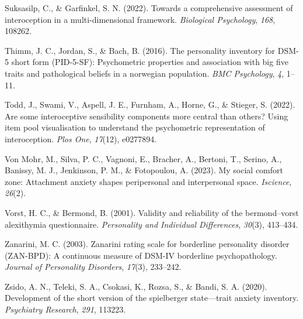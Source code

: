 \documentclass[
  jou,
  floatsintext,
  longtable,
  nolmodern,
  notxfonts,
  notimes,
  colorlinks=true,linkcolor=blue,citecolor=blue,urlcolor=blue]{apa7}
\newlength{\cslhangindent}
\newenvironment{CSLReferences}[2] %
 {\begin{list}{}{%
  \setlength{\itemindent}{0pt}
  \setlength{\leftmargin}{0pt}
  \setlength{\parsep}{0pt}
  \ifodd #1
   \setlength{\leftmargin}{\cslhangindent}
   \setlength{\itemindent}{-1\cslhangindent}
  \fi
  \setlength{\itemsep}{#2\baselineskip}}}
 {\end{list}}
\begin{document}
\begin{CSLReferences}{1}{0}
Suksasilp, C., \& Garfinkel, S. N. (2022). Towards a comprehensive
assessment of interoception in a multi-dimensional framework.
\emph{Biological Psychology}, \emph{168}, 108262.

Thimm, J. C., Jordan, S., \& Bach, B. (2016). The personality inventory
for DSM-5 short form (PID-5-SF): Psychometric properties and association
with big five traits and pathological beliefs in a norwegian population.
\emph{BMC Psychology}, \emph{4}, 1--11.

Todd, J., Swami, V., Aspell, J. E., Furnham, A., Horne, G., \& Stieger,
S. (2022). Are some interoceptive sensibility components more central
than others? Using item pool visualisation to understand the
psychometric representation of interoception. \emph{Plos One},
\emph{17}(12), e0277894.

Von Mohr, M., Silva, P. C., Vagnoni, E., Bracher, A., Bertoni, T.,
Serino, A., Banissy, M. J., Jenkinson, P. M., \& Fotopoulou, A. (2023).
My social comfort zone: Attachment anxiety shapes peripersonal and
interpersonal space. \emph{Iscience}, \emph{26}(2).

Vorst, H. C., \& Bermond, B. (2001). Validity and reliability of the
bermond--vorst alexithymia questionnaire. \emph{Personality and
Individual Differences}, \emph{30}(3), 413--434.

Zanarini, M. C. (2003). Zanarini rating scale for borderline personality
disorder (ZAN-BPD): A continuous measure of DSM-IV borderline
psychopathology. \emph{Journal of Personality Disorders}, \emph{17}(3),
233--242.

Zsido, A. N., Teleki, S. A., Csokasi, K., Rozsa, S., \& Bandi, S. A.
(2020). Development of the short version of the spielberger
state---trait anxiety inventory. \emph{Psychiatry Research}, \emph{291},
113223.

\end{CSLReferences}
\end{document}
